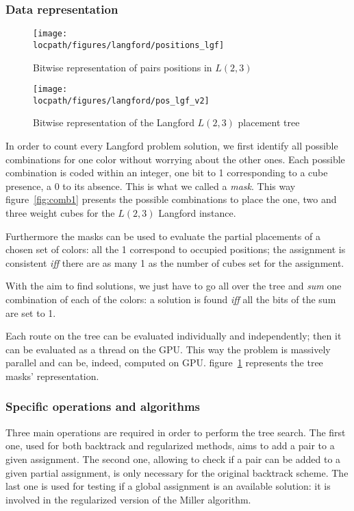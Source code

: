 \subsubsection{Data representation}

\begin{figure}[htb]
\begin{minipage}[b]{0.40\linewidth}
\centering
\texttt{[image: \\locpath/figures/langford/positions\_lgf]}
\caption{ Bitwise representation of pairs positions in $L(2,3)$} \label{fig:comb1}
\end{minipage}
\hfill
\begin{minipage}[b]{0.55\linewidth}
\centering
\texttt{[image: \\locpath/figures/langford/pos\_lgf\_v2]}
\caption{Bitwise representation of the Langford $L(2,3)$ placement tree}\label{fig:pos_lgf}
\end{minipage}
\end{figure}

In order to count every Langford problem solution, we first identify all possible combinations for one color without worrying about the other ones. 
Each possible combination is coded within an integer, one bit to 1 corresponding to a cube presence, a 0 to its absence. This is what we called a \emph{mask}.
This way figure~\ref{fig:comb1} presents the possible combinations to place the one, two and three weight cubes for the $L(2,3)$ Langford instance.

Furthermore the masks can be used to evaluate the partial placements of a chosen set of colors: all the 1 correspond to occupied positions; the assignment is consistent \emph{iff} there are as many 1 as the number of cubes set for the assignment. 

With the aim to find solutions, we just have to go all over the tree and \emph{sum} one combination of each of the colors: a solution is found \emph{iff} all the bits of the sum are set to 1. 

Each route on the tree can be evaluated individually and independently; then it can be evaluated as a thread on the GPU.
This way the problem is massively parallel and can be, indeed, computed on GPU. figure~\ref{fig:pos_lgf} represents the tree masks' representation.

\subsubsection{Specific operations and algorithms}

Three main operations are required in order to perform the tree search. 
The first one, used for both backtrack and regularized methods, aims to add a pair to a given assignment. 
The second one, allowing to check if a pair can be added to a given partial assignment, is only necessary for the original backtrack scheme.
The last one is used for testing if a global assignment is an available solution: it is involved in the regularized version of the Miller algorithm.

